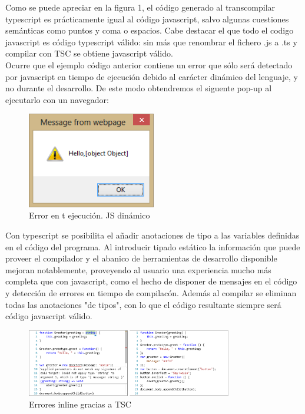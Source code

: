 \documentclass[12pt,twoside,a4paper, spanish]{article}
\begin{document}
	Como se puede apreciar en la figura 1, el código generado al transcompilar typescript es prácticamente igual al código javascript, salvo algunas cuestiones semánticas como puntos y coma o espacios. Cabe destacar el que todo el codigo javascript es código typescript válido: sin más que renombrar el fichero .js a .ts y compilar con TSC se obtiene javascript válido. \\
	
	Ocurre que el ejemplo código anterior contiene un error que sólo será detectado por javascript en tiempo de ejecución debido al carácter dinámico del lenguaje, y no durante el desarrollo. De este modo obtendremos el siguente pop-up al ejecutarlo con un navegador:
	
	\begin{figure}[h]
		\centering
		\includegraphics[width=0.5\textwidth]{imagenes/ts4.png}
		\caption{Error en t ejecución. JS dinámico}
	\end{figure}

	Con typescript se posibilita el añadir anotaciones de tipo a las variables definidas
	en el código del programa. Al introducir tipado estático la información que puede proveer el compilador y el abanico de herramientas de desarrollo disponible mejoran notablemente, proveyendo al usuario una experiencia mucho más completa que con javascript, como el hecho de disponer de mensajes en el código y detección de errores en tiempo de compilacón. Además al compilar se eliminan todas las anotaciones "de tipos", con lo que el código resultante siempre será código javascript válido.
	
	\begin{figure}[h]
		\centering
		\includegraphics[width=0.8\textwidth]{imagenes/ts5.png}
		\caption{Errores inline gracias a TSC}
	\end{figure}
\end{document}
